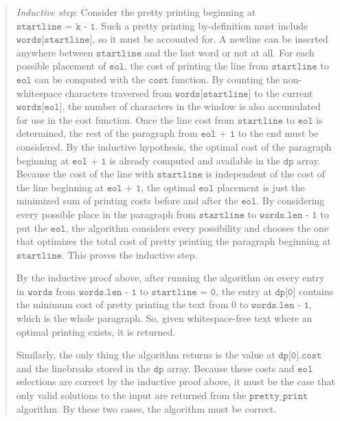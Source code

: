 \documentclass[11pt]{article}
\newcommand{\code}[1]{$\texttt{#1}$}
\begin{document}
\begin{enumerate}
\begin{enumerate}
\begin{quote}
\medskip
\textit{Inductive step}: Consider the pretty printing beginning at \code{startline = k - 1}. Such a pretty printing by-definition must include \code{words[startline]}, so it must be accounted for. A newline can be inserted anywhere between \code{startline} and the last word or not at all. For each possible placement of \code{eol}, the cost of printing the line from \code{startline} to \code{eol} can be computed with the \code{cost} function. By counting the non-whitespace characters traversed from \code{words[startline]} to the current \code{words[eol]}, the number of characters in the window is also accumulated for use in the cost function. Once the line cost from \code{startline} to \code{eol} is determined, the rest of the paragraph from \code{eol + 1} to the end must be considered. By the inductive hypothesis, the optimal cost of the paragraph beginning at \code{eol + 1} is already computed and available in the \code{dp} array. Because the cost of the line with \code{startline} is independent of the cost of the line beginning at \code{eol + 1}, the optimal \code{eol} placement is just the minimized sum of printing costs before and after the \code{eol}. By considering every possible place in the paragraph from \code{startline} to \code{words.len - 1} to put the \code{eol}, the algorithm considers every possibility and chooses the one that optimizes the total cost of pretty printing the paragraph beginning at \code{startline}. This proves the inductive step.

\medskip 
By the inductive proof above, after running the algorithm on every entry in \code{words} from \code{words.len - 1} to \code{startline = 0}, the entry at \code{dp[0]} contains the minimum cost of pretty printing the text from $0$ to \code{words.len - 1}, which is the whole paragraph. So, given whitespace-free text where an optimal printing exists, it is returned.

\medskip
Similarly, the only thing the algorithm returns is the value at \code{dp[0].cost} and the linebreaks stored in the \code{dp} array. Because these costs and \code{eol} selections are correct by the inductive proof above, it must be the case that only valid solutions to the input are returned from the \code{pretty\_print} algorithm. By these two cases, the algorithm must be correct.


\end{quote}
\end{enumerate}
\end{enumerate}
\end{document}
